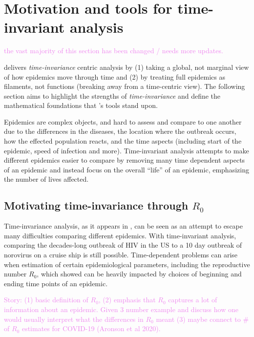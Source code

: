 \documentclass[
  shortnames]{jss}
\begin{document}
\section[Time-invariant]{Motivation and tools for time-invariant
analysis}\label{sec:time-invariant}

\textcolor{violet}{the vast majority of this section has been changed / needs more updates.}

 delivers \textit{time-invariance} centric analysis by
(1) taking a global, not marginal view of how epidemics move through
time and (2) by treating full epidemics as filaments, not functions
(breaking away from a time-centric view). The following section aims to
highlight the strengths of \textit{time-invariance} and define the
mathematical foundations that 's tools stand upon.

Epidemics are complex objects, and hard to assess and compare to one
another due to the differences in the diseases, the location where the
outbreak occurs, how the effected population reacts, and the time
aspects (including start of the epidemic, speed of infection and more).
Time-invariant analysis attempts to make different epidemics easier to
compare by removing many time dependent aspects of an epidemic and
instead focus on the overall ``life'' of an epidemic, emphasizing the
number of lives affected.

\subsection[motivating through R0]{Motivating time-invariance through
\(R_0\)}\label{r0}

Time-invariance analysis, as it appears in , can be seen
as an attempt to escape many difficulties comparing different epidemics.
With time-invariant analysis, comparing the decades-long outbreak of HIV
in the US to a 10 day outbreak of norovirus on a cruise ship is still
possible. Time-dependent problems can arise when estimation of certain
epidemiological parameters, including the reproductive number \(R_0\),
which \citet{Gallagher2020} showed can be heavily impacted by choices of
beginning and ending time points of an epidemic.

\textcolor{violet}{
Story: 
(1) basic definition of $R_0$, (2) emphasis that $R_0$ captures a lot of information about an epidemic. Given 3 number example and discuss how one would usually interpret what the differences in $R_0$ meant (3) maybe connect to \# of $R_0$ estimates for COVID-19 (Aronson et al 2020). 
}
\end{document}
